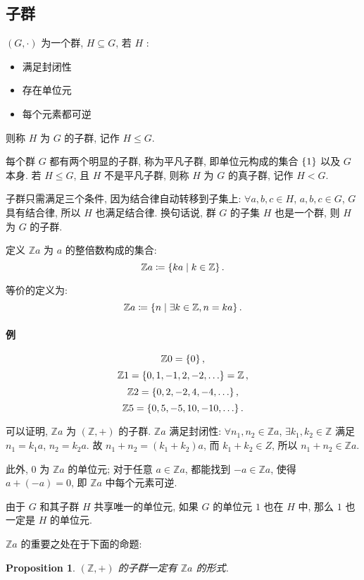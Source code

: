 \documentclass[UTF8]{ctexart}
\theoremstyle{mystyle}
\newtheorem{proposition}{Proposition}[section]
\theoremstyle{myremark}
\theoremstyle{plain}
\newcommand{\Z}{\mathbb Z}
\DeclarePairedDelimiter\set{\{}{\}}
\begin{document}
\subsection{子群}
\begin{definition}[\text{子群}]
    $ (G, \cdot) $ 为一个群, $ H \subseteq G $, 若 $ H $ :
    \begin{itemize}
        \item 满足封闭性
        \item 存在单位元
        \item 每个元素都可逆
    \end{itemize}
    则称 $ H $ 为 $ G $ 的子群, 记作 $ H \le G $.

    每个群 $ G $ 都有两个明显的子群, 称为平凡子群, 即单位元构成的集合 $ \set{1} $ 以及 $ G $ 本身. 若 $ H \le G $, 且 $ H $ 不是平凡子群, 则称 $ H $ 为 $ G $ 的真子群, 记作 $ H < G $.
\end{definition}

子群只需满足三个条件, 因为结合律自动转移到子集上: $ \forall a, b, c \in H $, $ a, b, c \in G $, $ G $ 具有结合律, 所以 $ H $ 也满足结合律. 换句话说, 群 $ G $ 的子集 $ H $ 也是一个群, 则 $ H $ 为 $ G $ 的子群.


定义 $ \Z a $ 为 $ a $ 的整倍数构成的集合:
\[ \Z a \coloneqq \set{k a \mid k \in \Z} \,.\]

等价的定义为:
\[ \Z a \coloneqq \set{n \mid \exists k \in \Z, n = k a} \,.\]

\paragraph{例}
\[ \Z 0 = \set{0} \,,\]
\[ \Z 1 = \set{0, 1, -1, 2, -2, \dots} = \Z \,,\]
\[ \Z 2 = \set{0, 2, -2, 4, -4, \dots} \,,\]
\[ \Z 5 = \set{0, 5, -5, 10, -10, \dots} \,.\]


可以证明, $ \Z a $ 为 $ (\Z, +) $ 的子群. $ \Z a $ 满足封闭性: $ \forall n_1, n_2 \in \Z a $, $ \exists k_1, k_2 \in \Z $ 满足 $ n_1 = k_1 a $, $ n_2 = k_2 a $. 故 $ n_1 + n_2 = (k_1 + k_2) a $, 而 $ k_1 + k_2 \in Z $, 所以 $ n_1 + n_2 \in \Z a $.

此外, $ 0 $ 为 $ \Z a $ 的单位元; 对于任意 $ a \in \Z a $, 都能找到 $ -a \in \Z a $, 使得 $ a + (-a) = 0 $, 即 $ \Z a $ 中每个元素可逆.

 
由于 $ G $ 和其子群 $ H $ 共享唯一的单位元, 如果 $ G $ 的单位元 $ 1 $ 也在 $ H $ 中, 那么 $ 1 $ 也一定是 $ H $ 的单位元.

$ \Z a $ 的重要之处在于下面的命题:
\begin{proposition}
    $ (\Z, +) $ 的子群一定有 $ \Z a $ 的形式.
\end{proposition}
\end{document}
